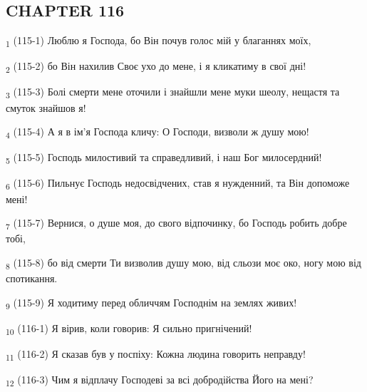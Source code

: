 \subsection{CHAPTER 116}
\begin{tcolorbox}
\textsubscript{1} (115-1) Люблю я Господа, бо Він почув голос мій у благаннях моїх,
\end{tcolorbox}
\begin{tcolorbox}
\textsubscript{2} (115-2) бо Він нахилив Своє ухо до мене, і я кликатиму в свої дні!
\end{tcolorbox}
\begin{tcolorbox}
\textsubscript{3} (115-3) Болі смерти мене оточили і знайшли мене муки шеолу, нещастя та смуток знайшов я!
\end{tcolorbox}
\begin{tcolorbox}
\textsubscript{4} (115-4) А я в ім'я Господа кличу: О Господи, визволи ж душу мою!
\end{tcolorbox}
\begin{tcolorbox}
\textsubscript{5} (115-5) Господь милостивий та справедливий, і наш Бог милосердний!
\end{tcolorbox}
\begin{tcolorbox}
\textsubscript{6} (115-6) Пильнує Господь недосвідчених, став я нужденний, та Він допоможе мені!
\end{tcolorbox}
\begin{tcolorbox}
\textsubscript{7} (115-7) Вернися, о душе моя, до свого відпочинку, бо Господь робить добре тобі,
\end{tcolorbox}
\begin{tcolorbox}
\textsubscript{8} (115-8) бо від смерти Ти визволив душу мою, від сльози моє око, ногу мою від спотикання.
\end{tcolorbox}
\begin{tcolorbox}
\textsubscript{9} (115-9) Я ходитиму перед обличчям Господнім на землях живих!
\end{tcolorbox}
\begin{tcolorbox}
\textsubscript{10} (116-1) Я вірив, коли говорив: Я сильно пригнічений!
\end{tcolorbox}
\begin{tcolorbox}
\textsubscript{11} (116-2) Я сказав був у поспіху: Кожна людина говорить неправду!
\end{tcolorbox}
\begin{tcolorbox}
\textsubscript{12} (116-3) Чим я відплачу Господеві за всі добродійства Його на мені?
\end{tcolorbox}
